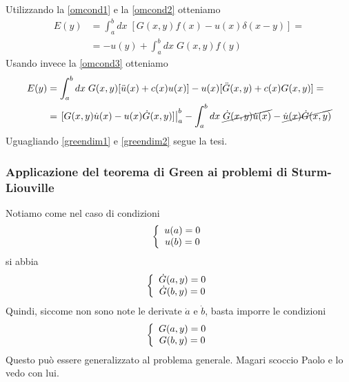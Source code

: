 Utilizzando la \ref{omcond1} e la \ref{omcond2} otteniamo
\begin{align}
	E(y) &= \int_{a}^{b} dx \; [G(x,y) f(x) - u(x)  \delta(x-y)] = \nonumber \\
	&= -u(y) +\int_{a}^{b} dx \; G(x,y) f(y) \label{greendim1}
\end{align}
Usando invece la \ref{omcond3} otteniamo
\begin{align}
	E(y) &= \int_{a}^{b} dx \; G(x,y) [\ddot{u}(x) + c(x)u(x)] - u(x)  [\ddot{G}(x,y) + c(x) G(x,y)] = \nonumber\\
	&= \left.[G(x,y)\dot{u}(x) - u(x)\dot{G}(x,y)]\right|_a^b - \int_{a}^{b} dx \; \cancel{\dot{G}(x,y) \dot{u}(x)} - \cancel{\dot{u}(x) \dot{G}(x,y)}  \label{greendim2}
\end{align}
Uguagliando \ref{greendim1} e \ref{greendim2} segue la tesi.

\subsubsection{Applicazione del teorema di Green ai problemi di Sturm-Liouville}

Notiamo come nel caso di condizioni
\begin{align}
	\left\{ \begin{array}{cc} u(a)=0\\ u(b)=0 \end{array} \right.
\end{align}
si abbia
\begin{align}
	\left\{ \begin{array}{cc} \dot{G}(a,y)=0\\ \dot{G}(b,y)=0 \end{array} \right.
\end{align}
Quindi, siccome non sono note le derivate $\dot{a}$ e $\dot{b}$, basta imporre le condizioni
\begin{align}
	\left\{ \begin{array}{cc} G(a,y)=0\\ G(b,y)=0 \end{array} \right.
\end{align}
Questo può essere generalizzato al problema generale. Magari scoccio Paolo e lo vedo con lui.

